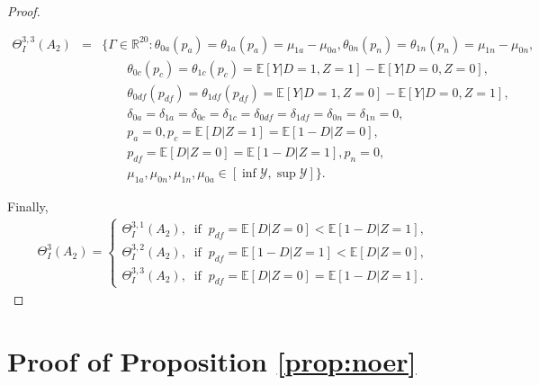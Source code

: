 \documentclass[12pt]{article}
\theoremstyle{plain}
\theoremstyle{definition}
\theoremstyle{remark}
\begin{document}
\begin{proof}
\begin{enumerate}
\end{enumerate}


\begin{eqnarray*}
    \Theta_I^{3,3}(A_2) &=& \Bigg \{\Gamma \in \mathbb R^{20}: \theta_{0a}(p_a)=\theta_{1a}(p_a) = \mu_{1a} - \mu_{0a}, \theta_{0n}(p_n) = \theta_{1n}(p_n) = \mu_{1n} - \mu_{0n},\\
   && \qquad \theta_{0c}(p_{c})=\theta_{1c}(p_{c})=\mathbb{E}[Y  \vert  D=1, Z=1]-\mathbb{E}[Y  \vert D=0, Z=0],\\   
   &&\qquad \theta_{0df}(p_{df})=\theta_{1df}(p_{df}) = \mathbb{E}[Y  \vert  D=1, Z=0]- \mathbb{E}[Y  \vert D=0, Z=1],\\   
   && \qquad \delta_{0a}=\delta_{1a}=\delta_{0c}=\delta_{1c}=\delta_{0df}=\delta_{1df}=\delta_{0n}=\delta_{1n}=0,\\
   && \qquad p_a=0, p_c=\mathbb{E}[D  \vert  Z=1]=\mathbb{E}[1-D  \vert  Z=0], \\
   && \qquad p_{df}=\mathbb{E}[D  \vert  Z=0]=\mathbb{E}[1-D  \vert  Z=1], p_n=0,\\
    && \qquad \mu_{1a}, \mu_{0n}, \mu_{1n}, \mu_{0a} \in \left[\inf \mathcal{Y}, \sup \mathcal{Y}\right]
   \Bigg \}. 
\end{eqnarray*}

Finally,
\begin{eqnarray*} 
\Theta_I^3(A_2)=\left\{\begin{array}{l}
        \Theta_I^{3,1}(A_2),\ \text{ if }\ p_{df}=\mathbb E[D\vert Z=0] < \mathbb E[1-D\vert Z=1],\\
        \Theta_I^{3,2}(A_2),\ \text{ if }\ p_{df}=\mathbb E[1-D\vert Z=1] < \mathbb E[D\vert Z=0],\\
       \Theta_I^{3,3}(A_2),\ \text{ if }\ p_{df}=\mathbb E[D\vert Z=0] = \mathbb E[1-D\vert Z=1].
        \end{array}\right.
\end{eqnarray*}
\end{proof}



\section{Proof of Proposition \ref{prop:noer}}\label{propC}
\end{document}
